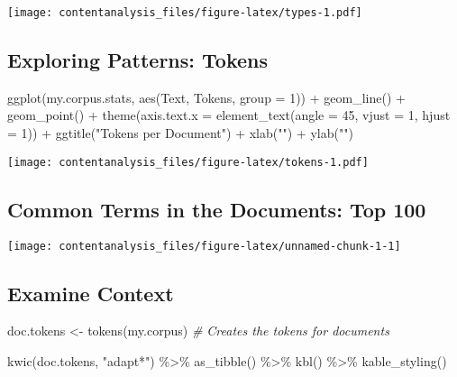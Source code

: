 \documentclass[
]{article}
\newenvironment{Shaded}{\begin{snugshade}}{\end{snugshade}}
\newcommand{\AttributeTok}[1]{\textcolor[rgb]{0.77,0.63,0.00}{#1}}
\newcommand{\CommentTok}[1]{\textcolor[rgb]{0.56,0.35,0.01}{\textit{#1}}}
\newcommand{\DecValTok}[1]{\textcolor[rgb]{0.00,0.00,0.81}{#1}}
\newcommand{\FunctionTok}[1]{\textcolor[rgb]{0.00,0.00,0.00}{#1}}
\newcommand{\NormalTok}[1]{#1}
\newcommand{\OtherTok}[1]{\textcolor[rgb]{0.56,0.35,0.01}{#1}}
\newcommand{\SpecialCharTok}[1]{\textcolor[rgb]{0.00,0.00,0.00}{#1}}
\newcommand{\StringTok}[1]{\textcolor[rgb]{0.31,0.60,0.02}{#1}}
\begin{document}
\texttt{[image: contentanalysis\_files/figure-latex/types-1.pdf]}

\hypertarget{exploring-patterns-tokens}{%
\subsection{Exploring Patterns:
Tokens}\label{exploring-patterns-tokens}}

\begin{Shaded}
\begin{Highlighting}[]
\FunctionTok{ggplot}\NormalTok{(my.corpus.stats, }\FunctionTok{aes}\NormalTok{(Text, Tokens, }\AttributeTok{group =} \DecValTok{1}\NormalTok{)) }\SpecialCharTok{+} \FunctionTok{geom\_line}\NormalTok{() }\SpecialCharTok{+} \FunctionTok{geom\_point}\NormalTok{() }\SpecialCharTok{+} \FunctionTok{theme}\NormalTok{(}\AttributeTok{axis.text.x =} \FunctionTok{element\_text}\NormalTok{(}\AttributeTok{angle =} \DecValTok{45}\NormalTok{, }\AttributeTok{vjust =} \DecValTok{1}\NormalTok{, }\AttributeTok{hjust =} \DecValTok{1}\NormalTok{)) }\SpecialCharTok{+} \FunctionTok{ggtitle}\NormalTok{(}\StringTok{"Tokens per Document"}\NormalTok{) }\SpecialCharTok{+} \FunctionTok{xlab}\NormalTok{(}\StringTok{""}\NormalTok{) }\SpecialCharTok{+} \FunctionTok{ylab}\NormalTok{(}\StringTok{""}\NormalTok{)}
\end{Highlighting}
\end{Shaded}

\texttt{[image: contentanalysis\_files/figure-latex/tokens-1.pdf]}

\hypertarget{common-terms-in-the-documents-top-100}{%
\subsection{Common Terms in the Documents: Top
100}\label{common-terms-in-the-documents-top-100}}

\texttt{[image: contentanalysis\_files/figure-latex/unnamed-chunk-1-1]}

\hypertarget{examine-context}{%
\subsection{Examine Context}\label{examine-context}}

\begin{Shaded}
\begin{Highlighting}[]
\NormalTok{doc.tokens }\OtherTok{\textless{}{-}} \FunctionTok{tokens}\NormalTok{(my.corpus) }\CommentTok{\# Creates the tokens for documents}

\FunctionTok{kwic}\NormalTok{(doc.tokens, }\StringTok{"adapt*"}\NormalTok{) }\SpecialCharTok{\%\textgreater{}\%} \FunctionTok{as\_tibble}\NormalTok{() }\SpecialCharTok{\%\textgreater{}\%} 
  \FunctionTok{kbl}\NormalTok{() }\SpecialCharTok{\%\textgreater{}\%} \FunctionTok{kable\_styling}\NormalTok{()}
\end{Highlighting}
\end{Shaded}
\end{document}
